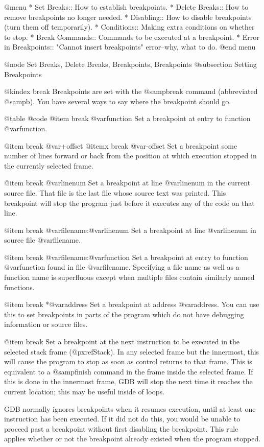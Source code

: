 @menu
* Set Breaks::     How to establish breakpoints.
* Delete Breaks::   How to remove breakpoints no longer needed.
* Disabling::      How to disable breakpoints (turn them off temporarily).
* Conditions::     Making extra conditions on whether to stop.
* Break Commands:: Commands to be executed at a breakpoint.
* Error in Breakpoints:: "Cannot insert breakpoints" error--why, what to do.
@end menu

@node Set Breaks, Delete Breaks, Breakpoints, Breakpoints
@subsection Setting Breakpoints

@kindex break
Breakpoints are set with the @samp{break} command (abbreviated @samp{b}).
You have several ways to say where the breakpoint should go.

@table @code
@item break @var{function}
Set a breakpoint at entry to function @var{function}.

@item break @var{+offset}
@itemx break @var{-offset}
Set a breakpoint some number of lines forward or back from the position
at which execution stopped in the currently selected frame.

@item break @var{linenum}
Set a breakpoint at line @var{linenum} in the current source file.
That file is the last file whose source text was printed.  This
breakpoint will stop the program just before it executes any of the
code on that line.

@item break @var{filename}:@var{linenum}
Set a breakpoint at line @var{linenum} in source file @var{filename}.

@item break @var{filename}:@var{function}
Set a breakpoint at entry to function @var{function} found in file
@var{filename}.  Specifying a file name as well as a function name is
superfluous except when multiple files contain similarly named
functions.

@item break *@var{address}
Set a breakpoint at address @var{address}.  You can use this to set
breakpoints in parts of the program which do not have debugging
information or source files.

@item break
Set a breakpoint at the next instruction to be executed in the selected
stack frame (@pxref{Stack}).  In any selected frame but the innermost,
this will cause the program to stop as soon as control returns to that
frame.  This is equivalent to a @samp{finish} command in the frame
inside the selected frame.  If this is done in the innermost frame, GDB
will stop the next time it reaches the current location; this may be
useful inside of loops.

GDB normally ignores breakpoints when it resumes execution, until at
least one instruction has been executed.  If it did not do this, you
would be unable to proceed past a breakpoint without first disabling the
breakpoint.  This rule applies whether or not the breakpoint already
existed when the program stopped.

